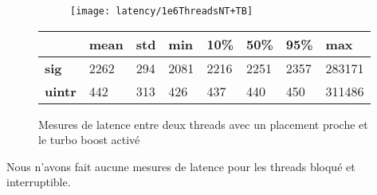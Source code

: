 \begin{figure}[H]
  \begin{subfigure}{\textwidth}
    \texttt{[image: latency/1e6ThreadsNT+TB]}
    \caption{}
    \label{subfig:latency1e6ThreadsNT-TB}
  \end{subfigure}
  \begin{subtable}{\textwidth}
    \centering
    \begin{tabular}{| l | l | l | l | l | l | l | l |}
      \hline
      &\bf mean &\bf std &\bf min  &\bf 10\% &\bf 50\% &\bf 95\% &\bf max\\
      \hline
      \bf sig   & 2262 & 294 & 2081 & 2216 & 2251 & 2357 & 283171\\
      \hline
      \bf uintr & 442  & 313 & 426  & 437  & 440  & 450  & 311486\\
      \hline
    \end{tabular}
    \caption{}
    \label{tab:latency1e6ThreadsNT-TB}
  \end{subtable}
  \caption{Mesures de latence entre deux threads avec un placement proche et le turbo boost activé}
  \label{fig:latency1e6ThreadsNT-TB}
\end{figure}

Nous n'avons fait aucune mesures de latence pour les threads bloqué et interruptible.
